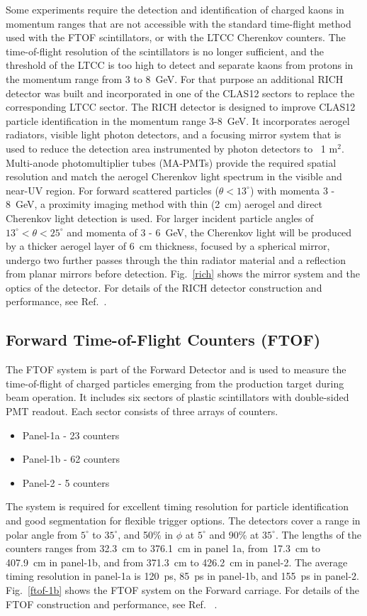 \documentclass[final,3p,times,twocolumn,authoryear]{elsarticle}
\begin{document}
Some experiments require the detection and identification of charged kaons in momentum ranges that are not accessible
with the standard time-flight method used with the FTOF scintillators, or with the LTCC Cherenkov counters. The
time-of-flight resolution of the scintillators is no longer sufficient, and the threshold of the LTCC is too high to detect
and separate kaons from protons in the momentum range from 3 to 8~GeV. For that purpose an additional RICH detector
was built and incorporated in one of the CLAS12 sectors to replace the corresponding LTCC sector. The RICH detector is
designed to improve CLAS12 particle identification in the momentum range 3-8~GeV. It incorporates aerogel radiators,
visible light photon detectors, and a focusing mirror system that is used to reduce the detection area instrumented by
photon detectors to ~1 m$^2$.  Multi-anode photomultiplier tubes (MA-PMTs) provide the required spatial resolution and
match the aerogel Cherenkov light spectrum in the visible and near-UV region. For forward scattered particles
($\theta < 13^\circ$) with momenta 3 - 8~GeV, a proximity imaging method with thin (2~cm) aerogel and direct Cherenkov
light detection is used. For larger incident particle angles of $13^\circ < \theta < 25^\circ$ and momenta of 3 - 6~GeV, the
Cherenkov light will be produced by a thicker aerogel layer of 6~cm thickness, focused by a spherical mirror, undergo two
further passes through the thin radiator material and a reflection from planar mirrors before detection. Fig.~\ref{rich}
shows the mirror system and the optics of the detector. For details of the RICH detector construction and performance,
see Ref.~\cite{RICH}.

\subsection{Forward Time-of-Flight Counters (FTOF)}
\label{ftof}

The FTOF system is part of the Forward Detector and is used to measure the time-of-flight of charged particles 
emerging from the production target during beam operation. It includes six sectors of plastic scintillators with 
double-sided PMT readout. Each sector consists of three arrays of counters. 
\begin{itemize}
\item Panel-1a - 23 counters 
\item Panel-1b - 62 counters
\item Panel-2 - 5 counters 
\end{itemize}
The system is required for excellent timing resolution for particle identification and good segmentation for 
flexible trigger options. The detectors cover a  range in polar angle from $5^\circ$ to $35^\circ$, and 50\% in $\phi$ at 
$5^\circ$ and 90\% at $35^\circ$. The lengths of the counters ranges from 32.3~cm to 376.1~cm in panel 1a, from~17.3~cm 
to 407.9~cm in panel-1b, and from 371.3~cm to 426.2~cm in panel-2.  The average timing resolution in panel-1a is 120~ps, 
85~ps in panel-1b, and 155~ps in panel-2.  Fig.~\ref{ftof-1b} shows the FTOF system on the Forward carriage.
For details of the FTOF construction and performance, see Ref. ~\cite{FTOF}. 
\end{document}
